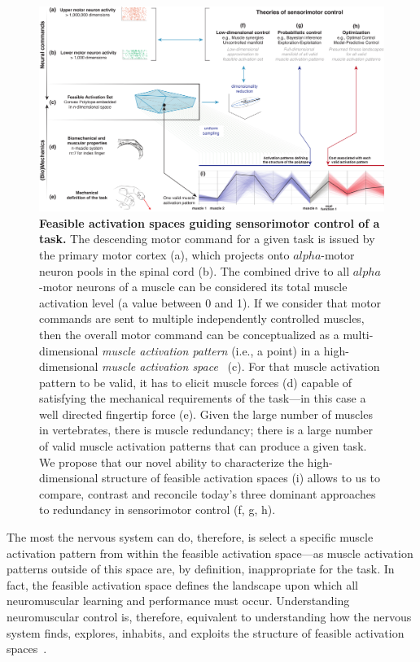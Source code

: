 \documentclass[9pt,twocolumn,twoside,lineno]{pnas-new}
\begin{document}
\begin{figure}[th]
\centering
\includegraphics[width=17.2cm]{numbered_figures/figure_1_overview.pdf}
\caption{\textbf{Feasible activation spaces guiding sensorimotor control of a task.} The descending motor command for a given task is issued by the primary motor cortex (a), which projects onto $alpha$-motor neuron pools in the spinal cord (b). The combined drive to all $alpha$-motor neurons of a muscle can be considered its total muscle activation level (a value between 0 and 1). If we consider that motor commands are sent to multiple independently controlled muscles, then the overall motor command can be conceptualized as a multi-dimensional \emph{muscle activation pattern} (i.e., a point) in a high-dimensional \emph{muscle activation space}~\cite{Chao1978Graphical, spoor1983balancing, Kuo1993Human, Valero-Cuevas1998Large} (c). For that muscle activation pattern to be valid, it has to elicit muscle forces (d) capable of satisfying the mechanical requirements of the task---in this case a well directed fingertip force (e). Given the large number of muscles in vertebrates, there is muscle redundancy; there is a large number of valid muscle activation patterns that can produce a given task. We propose that our novel ability to characterize the high-dimensional structure of feasible activation spaces (i) allows to us to compare, contrast and reconcile today's three dominant approaches to redundancy in sensorimotor control (f, g, h).}
\label{fig:overview}
\end{figure}


The most the nervous system can do, therefore, is select a specific muscle activation pattern from within the feasible activation space---as muscle activation patterns outside of this space are, by definition, inappropriate for the task.
In fact, the feasible activation space defines the landscape upon which all neuromuscular learning and performance must occur.
Understanding neuromuscular control is, therefore, equivalent to understanding how the nervous system finds, explores, inhabits, and exploits the structure of feasible activation spaces~\cite{kutch2012challenges,steele2013number,bizzi2013neural,gallego2017neuron,dingwell2010walkingvariability,racz2013spatiotemporal,steele2015consequences}.
\end{document}
